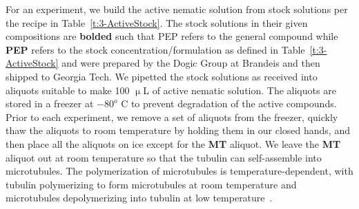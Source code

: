 For an experiment, we build the active nematic solution from stock solutions per the recipe in Table~\ref{t:3-ActiveStock}.
The stock solutions in their given compositions are {\bf bolded} such that PEP refers to the general compound while {\bf PEP} refers to the stock concentration/formulation as defined in Table~\ref{t:3-ActiveStock} and were prepared by the Dogic Group at Brandeis and then shipped to Georgia Tech.
We pipetted the stock solutions as received into aliquots suitable to make 100 $\upmu$L of active nematic solution.
The aliquots are stored in a freezer at $-80^o$ C to prevent degradation of the active compounds.
Prior to each experiment, we remove a set of aliquots from the freezer, quickly thaw the aliquots to room temperature by holding them in our closed hands, and then place all the aliquots on ice except for the {\bf MT} aliquot.
We leave the {\bf MT} aliquot out at room temperature so that the tubulin can self-assemble into microtubules.
The polymerization of microtubules is temperature-dependent, with tubulin polymerizing to form microtubules at room temperature and microtubules depolymerizing into tubulin at low temperature~\cite{RN3}.

